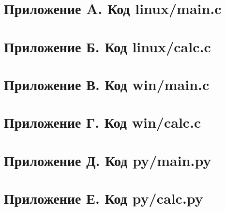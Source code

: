 \setcounter{secnumdepth}{-1}

\section{Приложение A. Код linux/main.c}

\newpage

\section{Приложение Б. Код linux/calc.c}

\newpage

\section{Приложение В. Код win/main.c}

\newpage

\section{Приложение Г. Код win/calc.c}

\newpage

\section{Приложение Д. Код py/main.py}

\newpage

\section{Приложение Е. Код py/calc.py}

\newpage